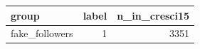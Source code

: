 \begin{tabular}{lrr}
\toprule
group & label & n_in_cresci15 \\
\midrule
fake_followers & 1 & 3351 \\
\bottomrule
\end{tabular}
